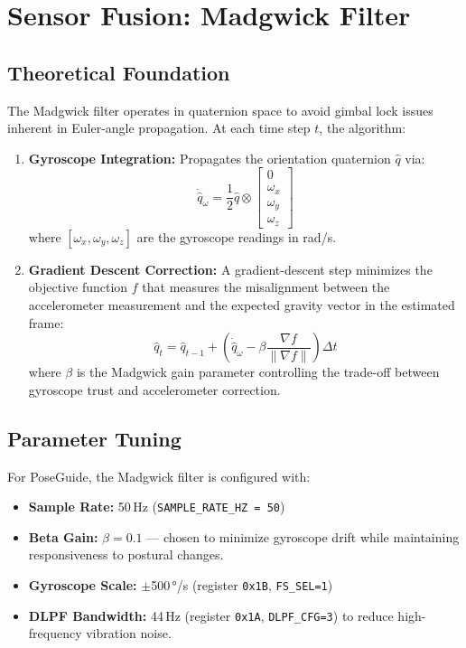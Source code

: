 \documentclass[12pt,a4paper]{report}
\newcommand{\code}[1]{\texttt{\small\color{accentviolet}#1}}
\begin{document}
\section{Sensor Fusion: Madgwick Filter}

\subsection{Theoretical Foundation}

The Madgwick filter operates in quaternion space to avoid gimbal lock issues inherent in Euler-angle propagation. At each time step $t$, the algorithm:

\begin{enumerate}[leftmargin=2em]
    \item \textbf{Gyroscope Integration:} Propagates the orientation quaternion $\hat{q}$ via:
    \[
        \dot{\hat{q}}_{\omega} = \frac{1}{2} \hat{q} \otimes \begin{bmatrix}0 \\ \omega_x \\ \omega_y \\ \omega_z\end{bmatrix}
    \]
    where $[\omega_x, \omega_y, \omega_z]$ are the gyroscope readings in rad/s.

    \item \textbf{Gradient Descent Correction:} A gradient-descent step minimizes the objective function $f$ that measures the misalignment between the accelerometer measurement and the expected gravity vector in the estimated frame:
    \[
        \hat{q}_{t} = \hat{q}_{t-1} + \left(\dot{\hat{q}}_{\omega} - \beta \frac{\nabla f}{\|\nabla f\|}\right) \Delta t
    \]
    where $\beta$ is the Madgwick gain parameter controlling the trade-off between gyroscope trust and accelerometer correction.
\end{enumerate}

\subsection{Parameter Tuning}

For PoseGuide, the Madgwick filter is configured with:

\begin{itemize}[leftmargin=2em]
    \item \textbf{Sample Rate:} 50\,Hz (\code{SAMPLE\_RATE\_HZ = 50})
    \item \textbf{Beta Gain:} $\beta = 0.1$ — chosen to minimize gyroscope drift while maintaining responsiveness to postural changes.
    \item \textbf{Gyroscope Scale:} $\pm$500\,°/s (register \code{0x1B}, \code{FS\_SEL=1})
    \item \textbf{DLPF Bandwidth:} 44\,Hz (register \code{0x1A}, \code{DLPF\_CFG=3}) to reduce high-frequency vibration noise.
\end{itemize}
\end{document}
